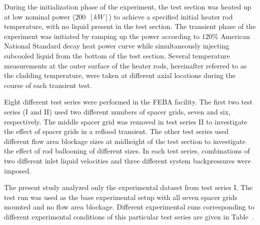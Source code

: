 During the initialization phase of the experiment, the test section was heated up at low nominal power ($200$~$[kW]$) to achieve a specified initial heater rod temperature, with no liquid present in the test section.
The transient phase of the experiment was initiated by ramping
up the power according to $120$\% American National Standard
decay heat power curve while simultaneously injecting
subcooled liquid from the bottom of the test section.
Several temperature measurements at the outer surface of
the heater rods, hereinafter referred to as the cladding
temperature, were taken at different axial locations during
the course of each transient test.

Eight different test series were performed in the
FEBA facility. 
The first two test series (I and II) used two
different numbers of spacer grids, seven and six, respectively.
The middle spacer grid was removed in test series II
to investigate the effect of spacer grids in a reflood transient.
The other test series used different flow area blockage sizes
at midheight of the test section to investigate the effect of rod
ballooning of different sizes. In each test series, combinations
of two different inlet liquid velocities and three different
system backpressures were imposed.

The present study analyzed only the experimental dataset from test series \textsc{I}.
The test run was used as the base experimental setup with all seven spacer grids mounted and no flow area blockage.
Different experimental runs corresponding to different experimental conditions of this particular test series are given in Table~.

